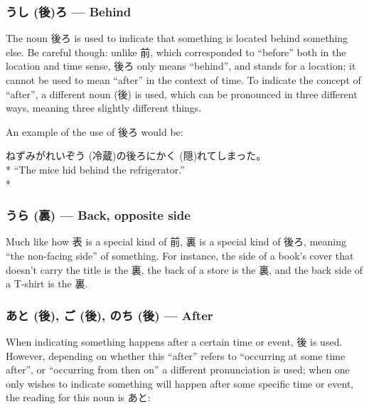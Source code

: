 \documentclass[11pt, b5paper, twoside, openright, onecolumn]{book}
\makeatletter
\newcommand*{\rubystack}[2]{{\relscale{0.5}%
  \begin{tabular}[b]{@{}c@{}}%
    {#1}\\%
   {\textscale{2}{#2}}%
  \end{tabular}}%
}
\DeclareRobustCommand*{\ruby}[2]{%
  \mbox{%
    \setlength{\parskip}{0ex}%
    \BeginAccSupp{method=pdfstringdef,ActualText={#1}}%
      \rubystack{\phantom{#2}}{#1}%
      \llap{%
        \rubystack{#2}{\phantom{#1}}%
      }%
    \EndAccSupp{}%
  }%
}
\renewcommand*{\ruby}[2]{#2 (#1)}%
\newenvironment{exampleblock}{
\setlength{\parindent}{0.6in}
\begin{minipage}[t]{\dimexpr\textwidth-\parindent}}
{\end{minipage}}
\makeatother
\begin{document}
\subsubsection{\ruby{後}{うし}ろ — Behind}

The noun 後ろ is used to indicate that something is located behind something else. Be careful though: unlike 前‚ which corresponded to “before” both in the location and time sense‚ 後ろ only means “behind”‚ and stands for a location; it cannot be used to mean “after” in the context of time. To indicate the concept of “after”‚ a different noun (後) is used‚ which can be pronounced in three different ways‚ meaning three slightly different things.

An example of the use of 後ろ would be:

\vspace{0.4cm}
\begin{exampleblock}
ねずみが\ruby{冷蔵}{れいぞう}の後ろに\ruby{隠}{かく}れてしまった。 \\* 
“The mice hid behind the refrigerator.” \\* 
\end{exampleblock}
\subsubsection{\ruby{裏}{うら} — Back‚ opposite side}


Much like how 表 is a special kind of 前‚ 裏 is a special kind of 後ろ‚ meaning “the non-facing side” of something. For instance‚ the side of a book’s cover that doesn’t carry the title is the 裏‚ the back of a store is the 裏‚ and the back side of a T-shirt is the 裏.

\subsubsection{\ruby{後}{あと}‚ \ruby{後}{ご}‚ \ruby{後}{のち} — After}

When indicating something happens after a certain time or event‚ 後 is used. However‚ depending on whether this “after” refers to “occurring at some time after”‚ or “occurring from then on” a different pronunciation is used; when one only wishes to indicate something will happen after some specific time or event‚ the reading for this noun is あと:
\end{document}
